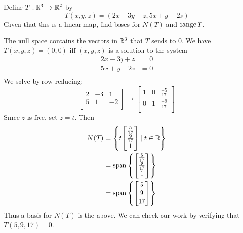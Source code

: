 \documentclass{article}
\DeclareMathOperator{\spn}{span}
\begin{document}
\begin{example}
  Define $T: \mathbb{R}^3 \to \mathbb{R}^2$ by \[
    T(x, y, z) = (2x - 3y + z, 5x + y - 2z)
  \]
  Given that this is a linear map, find bases for $N(T)$ and $\operatorname{\text{range}} T$.

  The null space contains the vectors in $\mathbb{R}^3$ that $T$ sends to $0$. We have $T(x, y, z) = (0, 0)$ iff $(x, y, z)$ is a solution to the system
  \begin{align*}
    2x - 3y + z & = 0 \\
    5x + y - 2z & = 0 \\
  \end{align*}
  We solve by row reducing:
  \[
    \begin{bmatrix}
      2 & -3 & 1  \\
      5 & 1  & -2 \\
    \end{bmatrix} \to
    \begin{bmatrix}
      1 & 0 & \frac{-5}{17} \\
      0 & 1 & \frac{-9}{17} \\
    \end{bmatrix}
  \]
  Since $z$ is free, set $z = t$. Then
  \begin{align*}
    N(T) & = \left\{ t
    \begin{bmatrix}
      \frac{5}{17} \\
      \frac{9}{17} \\
      1            \\
    \end{bmatrix} \mid t \in \R \right\} \\
         & = \spn \left\{
    \begin{bmatrix}
      \frac{5}{17} \\
      \frac{9}{17} \\
      1            \\
    \end{bmatrix} \right\}               \\
         & = \spn \left\{
    \begin{bmatrix}
      5 \\9\\17\\
    \end{bmatrix}\right\}
  \end{align*}
  Thus a basis for $N(T)$ is the above. We can check our work by verifying that $T(5, 9, 17) = 0$.


\end{example}
\end{document}

